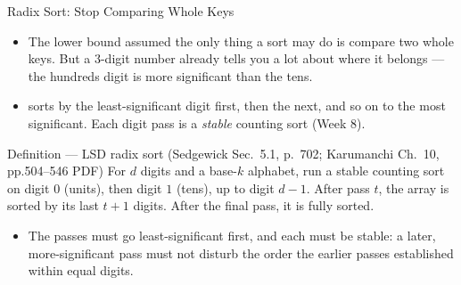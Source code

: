 \documentclass[aspectratio=169]{beamer}
\begin{document}
\begin{frame}{Radix Sort: Stop Comparing Whole Keys}
  \begin{itemize}
    \item The lower bound assumed the only thing a sort may do is compare two
      whole keys. But a $3$-digit number already tells you a lot about where
      it belongs --- the hundreds digit is more significant than the tens.
    \item {} sorts by the least-significant digit first,
      then the next, and so on to the most significant. Each digit pass is a
      \emph{stable} counting sort (Week 8).
  \end{itemize}
  \begin{block}{Definition --- LSD radix sort (Sedgewick Sec.~5.1, p.~702;
    Karumanchi Ch.~10, pp.504--546 PDF)}
    For $d$ digits and a base-$k$ alphabet, run a stable counting sort on
    digit $0$ (units), then digit $1$ (tens), up to digit $d-1$. After pass
    $t$, the array is sorted by its last $t+1$ digits. After the final pass,
    it is fully sorted.
  \end{block}
  \begin{itemize}
    \item The passes must go least-significant first, and each must be
      stable: a later, more-significant pass must not disturb the order the
      earlier passes established within equal digits.
  \end{itemize}
\end{frame}
\end{document}
